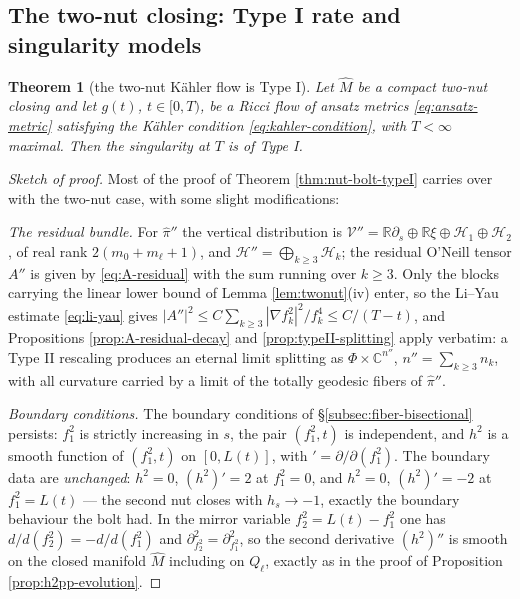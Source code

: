 \documentclass[11pt]{amsart}
\theoremstyle{plain}
\numberwithin{equation}{section}
\newtheorem{theorem}{Theorem}[section]
\theoremstyle{definition}
\theoremstyle{remark}
\begin{document}
\subsection{The two-nut closing: Type I rate and singularity models}\label{subsec:twonut}

\begin{theorem}[the two-nut K\"ahler flow is Type I]\label{thm:twonut_typeI}
Let $\widehat{M}$ be a compact two-nut closing and let $g (t)$, $t \in [ 0, T )$, be a Ricci flow of ansatz metrics \eqref{eq:ansatz-metric} satisfying the K\"ahler condition \eqref{eq:kahler-condition}, with $T < \infty$ maximal. Then the singularity at $T$ is of Type I.

\end{theorem}

\begin{proof}[Sketch of proof]
Most of the proof of Theorem \ref{thm:nut-bolt-typeI} carries over with the two-nut case, with some slight modifications:

\emph{The residual bundle.} For $\widehat{\pi}''$ the vertical distribution is $\mathcal{V}'' = \mathbb{R} \partial_s \oplus \mathbb{R} \xi \oplus \mathcal{H}_1 \oplus \mathcal{H}_2$, of real rank $2 ( m_0 + m_\ell + 1 )$, and $\mathcal{H}'' = \bigoplus_{k \geq 3} \mathcal{H}_k$; the residual O'Neill tensor $A''$ is given by \eqref{eq:A-residual} with the sum running over $k \geq 3$. Only the blocks carrying the linear lower bound of Lemma \ref{lem:twonut}(iv) enter, so the Li--Yau estimate \eqref{eq:li-yau} gives $| A'' |^2 \leq C \sum_{k \geq 3} | \nabla f_k^2 |^2 / f_k^4 \leq C / ( T - t )$, and Propositions \ref{prop:A-residual-decay} and \ref{prop:typeII-splitting} apply verbatim: a Type II rescaling produces an eternal limit splitting as $\Phi \times \mathbb{C}^{n''}$, $n'' = \sum_{k \geq 3} n_k$, with all curvature carried by a limit of the totally geodesic fibers of $\widehat{\pi}''$.

\emph{Boundary conditions.} The boundary conditions of \S\ref{subsec:fiber-bisectional} persists: $f_1^2$ is strictly increasing in $s$, the pair $( f_1^2, t )$ is independent, and $h^2$ is a smooth function of $( f_1^2, t )$ on $[ 0, L (t) ]$, with $' = \partial / \partial ( f_1^2 )$. The boundary data are \emph{unchanged}: $h^2 = 0$, $( h^2 )' = 2$ at $f_1^2 = 0$, and $h^2 = 0$, $( h^2 )' = - 2$ at $f_1^2 = L (t)$ --- the second nut closes with $h_s \to - 1$, exactly the boundary behaviour the bolt had. In the mirror variable $f_2^2 = L (t) - f_1^2$ one has $d / d ( f_2^2 ) = - d / d(f_1^2)$ and $\partial_{f_2^2}^2 = \partial_{f_1^2}^2$, so the second derivative $( h^2 )''$ is smooth on the closed manifold $\widehat{M}$ including on $Q_\ell$, exactly as in the proof of Proposition \ref{prop:h2pp-evolution}.


\end{proof}
\end{document}
